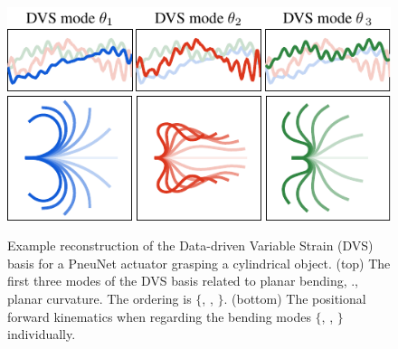 \begin{figure}[!t]
\centering
\includegraphics*[width=.8\textwidth]{./pdf/thesis-figure-6-11-2.pdf}  \\[0.15em]
\includegraphics*[width=.8\textwidth]{./pdf/thesis-figure-6-11-3.pdf}%
% 
\caption{\small Example reconstruction of the Data-driven Variable Strain (DVS) basis for a PneuNet actuator grasping a cylindrical object. (top) The first three modes of the DVS basis related to planar bending, \ie., planar curvature. The ordering is $\{$, , $\}$. (bottom) The positional forward kinematics when regarding the bending modes $\{$, , $\}$ individually.}
\label{fig:C5:gvis_modes}
\end{figure}
%

